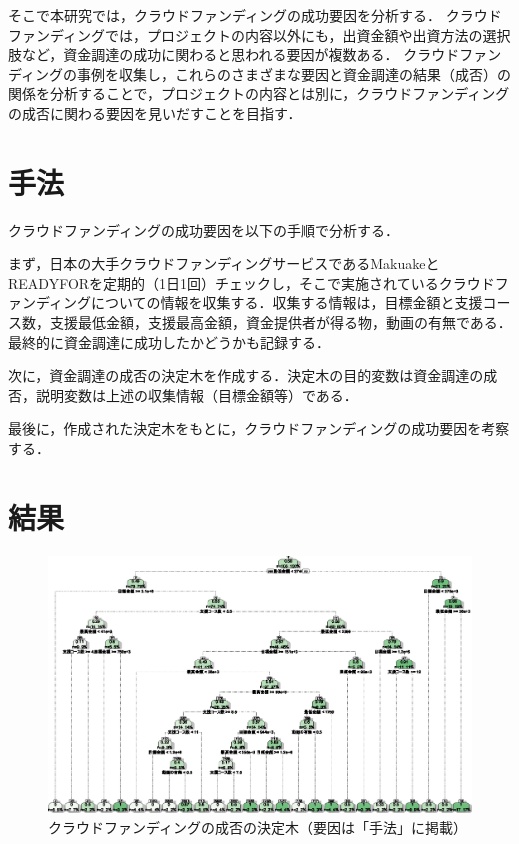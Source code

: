 \documentclass[uplatex,twocolumn]{jsarticle}
\begin{document}
そこで本研究では，クラウドファンディングの成功要因を分析する．
クラウドファンディングでは，プロジェクトの内容以外にも，出資金額や出資方法の選択肢など，資金調達の成功に関わると思われる要因が複数ある．
クラウドファンディングの事例を収集し，これらのさまざまな要因と資金調達の結果（成否）の関係を分析することで，プロジェクトの内容とは別に，クラウドファンディングの成否に関わる要因を見いだすことを目指す．

\section{手法}
クラウドファンディングの成功要因を以下の手順で分析する．

まず，日本の大手クラウドファンディングサービスであるMakuakeとREADYFORを定期的（1日1回）チェックし，そこで実施されているクラウドファンディングについての情報を収集する．収集する情報は，目標金額と支援コース数，支援最低金額，支援最高金額，資金提供者が得る物，動画の有無である．最終的に資金調達に成功したかどうかも記録する．

次に，資金調達の成否の決定木を作成する．決定木の目的変数は資金調達の成否，説明変数は上述の収集情報（目標金額等）である．

最後に，作成された決定木をもとに，クラウドファンディングの成功要因を考察する．

\section{結果}

\begin{figure}
\centering
\includegraphics[width=\textwidth]{figure.eps}
\caption{クラウドファンディングの成否の決定木（要因は「手法」に掲載）}\label{決定木}
\end{figure}
\end{document}
